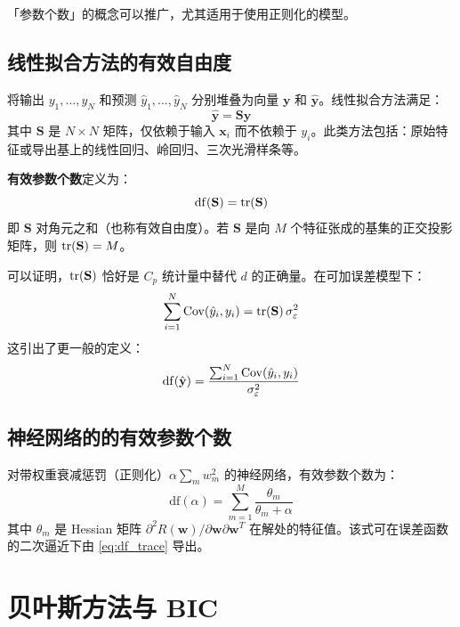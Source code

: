「参数个数」的概念可以推广，尤其适用于使用正则化的模型。

\subsection{线性拟合方法的有效自由度}

将输出 $y_1, \ldots, y_N$ 和预测 $\hat{y}_1, \ldots, \hat{y}_N$ 分别堆叠为向量 $\mathbf{y}$ 和 $\hat{\mathbf{y}}$。线性拟合方法满足：
\begin{equation}\label{eq:linear_fit}
    \hat{\mathbf{y}} = \mathbf{S} \mathbf{y}
\end{equation}
其中 $\mathbf{S}$ 是 $N \times N$ 矩阵，仅依赖于输入 $\mathbf{x}_i$ 而不依赖于 $y_i$。此类方法包括：原始特征或导出基上的线性回归、岭回归、三次光滑样条等。

\textbf{有效参数个数}定义为：
\begin{equation}\label{eq:df_trace}
    \mathrm{df}(\mathbf{S}) = \operatorname{tr}(\mathbf{S})
\end{equation}
即 $\mathbf{S}$ 对角元之和（也称有效自由度）。若 $\mathbf{S}$ 是向 $M$ 个特征张成的基集的正交投影矩阵，则 $\operatorname{tr}(\mathbf{S}) = M$。

可以证明，$\operatorname{tr}(\mathbf{S})$ 恰好是 $C_p$ 统计量中替代 $d$ 的正确量。在可加误差模型下：
\begin{equation}\label{eq:cov_trace}
    \sum_{i=1}^{N} \mathrm{Cov}(\hat{y}_i, y_i) = \operatorname{tr}(\mathbf{S})\,\sigma_\varepsilon^2
\end{equation}
这引出了更一般的定义：
\begin{equation}\label{eq:df_cov}
    \mathrm{df}(\hat{\mathbf{y}}) = \frac{\sum_{i=1}^{N} \mathrm{Cov}(\hat{y}_i, y_i)}{\sigma_\varepsilon^2}
\end{equation}

\subsection{神经网络的的有效参数个数}

对带权重衰减惩罚（正则化）$\alpha \sum_m w_m^2$ 的神经网络，有效参数个数为：
\begin{equation}\label{eq:df_nn}
    \mathrm{df}(\alpha) = \sum_{m=1}^{M} \frac{\theta_m}{\theta_m + \alpha}
\end{equation}
其中 $\theta_m$ 是 Hessian 矩阵 $\partial^2 R(\mathbf{w})/\partial\mathbf{w}\partial\mathbf{w}^T$ 在解处的特征值。该式可在误差函数的二次逼近下由 \eqref{eq:df_trace} 导出。

\section{贝叶斯方法与 BIC}

